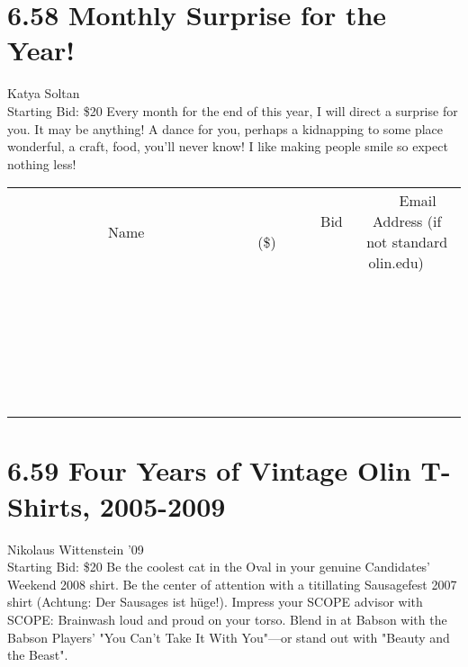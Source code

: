 \documentclass[11pt]{article}
\begin{document}
\section*{6.58 Monthly Surprise for the Year!}
Katya Soltan
\\
Starting Bid: \$20
\newline
Every month for the end of this year, I will direct a surprise for you. It may be anything! A dance for you, perhaps a kidnapping to some place wonderful, a craft, food, you'll never know! I like making people smile so expect nothing less!
\\[6ex]
\begin{tabular}{c c c}
~~~~~~~~~~~~~Name~~~~~~~~~~~~~ & ~~~~~~~~~Bid (\$)~~~~~~~~~  & ~~~Email Address (if not standard olin.edu)~~~\\
 & & \\
\hline
 & & \\
\hline
 & & \\
\hline
 & & \\
\hline
 & & \\
\hline
 & & \\
\hline
 & & \\
\hline
 & & \\
\hline
 & & \\
\hline
 & & \\
\hline
 & & \\
\hline
 & & \\
\hline
 & & \\
\hline
 & & \\
\hline
 & & \\
\hline
 & & \\
\hline
 & & \\
\hline
 & & \\
\hline
 & & \\
\hline
 & & \\
\hline
 & & \\
\hline
 & & \\
\hline
 & & \\
\hline
 & & \\
\hline
 & & \\
\hline
 & & \\
\hline
\end{tabular}
\newpage
\section*{6.59 Four Years of Vintage Olin T-Shirts, 2005-2009}
Nikolaus Wittenstein '09
\\
Starting Bid: \$20
\newline
Be the coolest cat in the Oval in your genuine Candidates' Weekend 2008 shirt. 
Be the center of attention with a titillating Sausagefest 2007 shirt (Achtung: Der Sausages ist hüge!).
Impress your SCOPE advisor with SCOPE: Brainwash loud and proud on your torso.
Blend in at Babson with the Babson Players' "You Can't Take It With You"—or stand out with "Beauty and the Beast".
\end{document}
